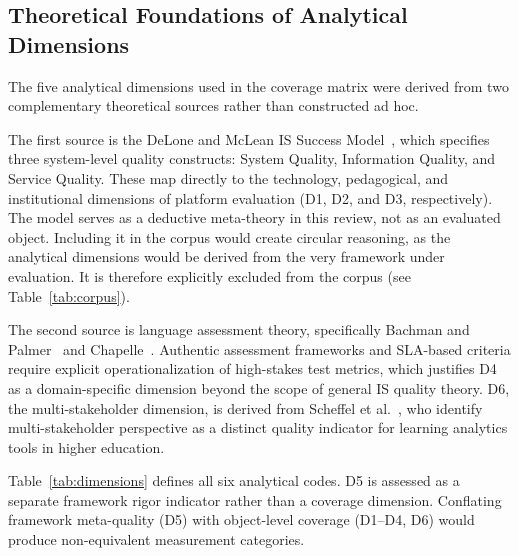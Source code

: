 \documentclass[conference]{IEEEtran}
\begin{document}
\subsection{Theoretical Foundations of Analytical Dimensions}

The five analytical dimensions used in the coverage matrix were
derived from two complementary theoretical sources rather than
constructed ad hoc.

The first source is the DeLone and McLean IS Success
Model~\cite{b10}, which specifies three system-level quality
constructs: System Quality, Information Quality, and Service Quality.
These map directly to the technology, pedagogical, and institutional
dimensions of platform evaluation (D1, D2, and D3, respectively).
The model serves as a deductive meta-theory in this review, not as
an evaluated object. Including it in the corpus would create circular
reasoning, as the analytical dimensions would be derived from the
very framework under evaluation. It is therefore explicitly excluded
from the corpus (see Table~\ref{tab:corpus}).

The second source is language assessment theory, specifically
Bachman and Palmer~\cite{b12} and Chapelle~\cite{b3}. Authentic
assessment frameworks and SLA-based criteria require explicit
operationalization of high-stakes test metrics, which justifies D4
as a domain-specific dimension beyond the scope of general IS quality
theory. D6, the multi-stakeholder dimension, is derived from
Scheffel et al.~\cite{b9}, who identify multi-stakeholder perspective
as a distinct quality indicator for learning analytics tools in
higher education.

Table~\ref{tab:dimensions} defines all six analytical codes. D5 is
assessed as a separate framework rigor indicator rather than a
coverage dimension. Conflating framework meta-quality (D5) with
object-level coverage (D1--D4, D6) would produce non-equivalent
measurement categories.
\end{document}
